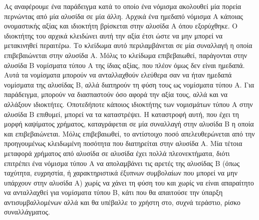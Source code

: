 Ας αναφέρουμε ένα παράδειγμα
κατά το οποίο ένα νόμισμα ακολουθεί μία πορεία περνώντας από μία αλυσίδα σε μία άλλη. Αρχικά ένα
ημεδαπό νόμισμα Α κάποιας ονομαστικής αξίας και ιδιοκτήτη βρίσκεται στην αλυσίδα Α όπου εξορύχθηκε. Ο
ιδιοκτήτης του αρχικά κλειδώνει αυτή την αξία έτσι ώστε να μην μπορεί να μετακινηθεί περαιτέρω.
Το κλείδωμα αυτό περιλαμβάνεται σε μία συναλλαγή η οποία επιβεβαιώνεται στην αλυσίδα Α. Μόλις
το κλείδωμα επιβεβαιωθεί, παράγονται στην αλυσίδα Β νομίσματα τύπου Α της ίδιας αξίας, που πλέον
όμως δεν είναι ημεδαπά. Αυτά τα νομίσματα μπορούν να ανταλλαχθούν ελεύθερα σαν να ήταν ημεδαπά
νομίσματα της αλυσίδας Β, αλλά διατηρούν τη φύση τους ως νομίσματα τύπου Α. Για παράδειγμα, μπορούν
να διασπαστούν όσο αφορά την αξία τους, αλλά και να αλλάξουν ιδιοκτήτες. Οποτεδήποτε κάποιος ιδιοκτήτης
των νομισμάτων τύπου Α στην αλυσίδα Β επιθυμεί, μπορεί να τα καταστρέψει. Η καταστροφή αυτή, που
έχει τη μορφή καψίματος χρήματος, καταγράφεται σε μία συναλλαγή στην αλυσίδα Β η οποία και επιβεβαιώνεται.
Μόλις επιβεβαιωθεί, το αντίστοιχο ποσό απελευθερώνεται από την προηγουμένως κλειδωμένη ποσότητα
που διατηρείται στην αλυσίδα Α. Μία τέτοια μεταφορά χρήματος από αλυσίδα σε αλυσίδα έχει πολλά
πλεονεκτήματα, διότι επιτρέπει ένα νόμισμα τύπου Α να απολαμβάνει τις αρετές της αλυσίδας Β
(όπως ταχύτητα, ευχρηστία, ή χαρακτηριστικά έξυπνων συμβολαίων που μπορεί να μην υπάρχουν στην
αλυσίδα Α) χωρίς να χάνει τη φύση του και χωρίς να είναι απαραίτητο να ανταλλαχθεί για νομίσματα
τύπου Β, κάτι που θα απαιτούσε την ύπαρξη αντισυμβαλλομένων αλλά και θα υπέβαλλε το χρήστη
στο, συχνά τεράστιο, ρίσκο συναλλάγματος.

